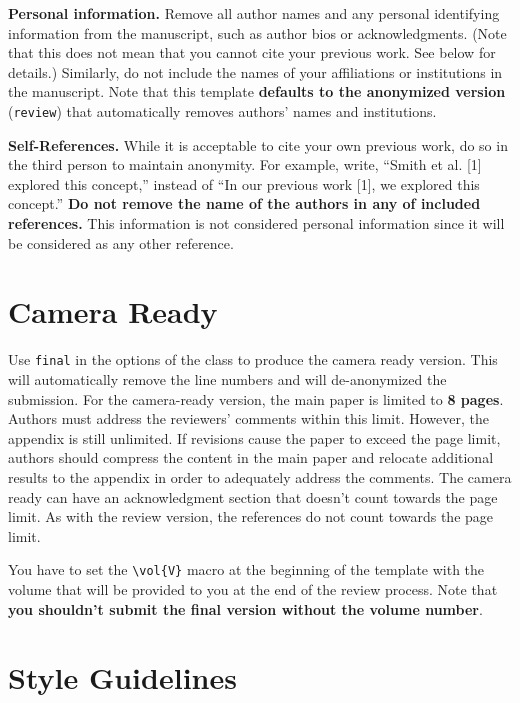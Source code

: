 \documentclass[fullpaper]{nldl}
\begin{document}
\textbf{Personal information.}
Remove all author names and any personal identifying information from the manuscript, such as author bios or acknowledgments.
(Note that this does not mean that you cannot cite your previous work.
See below for details.)
Similarly, do not include the names of your affiliations or institutions in the manuscript.
Note that this template \textbf{defaults to the anonymized version} (\verb|review|) that automatically removes authors' names and institutions.

\textbf{Self-References.}
While it is acceptable to cite your own previous work, do so in the third person to maintain anonymity.
For example, write, ``Smith et al. [1] explored this concept,'' instead of ``In our previous work [1], we explored this concept.''
\textbf{Do not remove the name of the authors in any of included references.}
This information is not considered personal information since it will be considered as any other reference.

\section{Camera Ready}

Use \verb|final| in the options of the class to produce the camera ready version.
This will automatically remove the line numbers and will de-anonymized the submission.
For the camera-ready version, the main paper is limited to \textbf{8 pages}.
Authors must address the reviewers' comments within this limit.
However, the appendix is still unlimited.
If revisions cause the paper to exceed the page limit, authors should compress the content in the main paper and relocate additional results to the appendix in order to adequately address the comments.
The camera ready can have an acknowledgment section that doesn't count towards the page limit.
As with the review version, the references do not count towards the page limit.

You have to set the \verb|\vol{V}| macro at the beginning of the template with the volume that will be provided to you at the end of the review process.
Note that \textbf{you shouldn't submit the final version without the volume number}.

\section{Style Guidelines}
\end{document}
